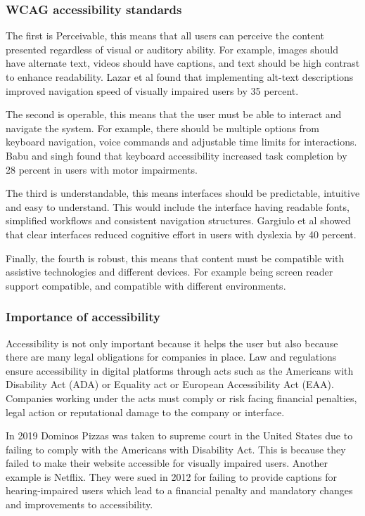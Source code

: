 \documentclass[]{project_final}
\begin{document}
\subsubsection{WCAG accessibility standards}

The first is Perceivable, this means that all users can perceive the content presented regardless of visual or auditory ability. For example, images should have alternate text, videos should have captions, and text should be high contrast to enhance readability. Lazar et al found that implementing alt-text descriptions improved navigation speed of visually impaired users by 35 percent.

The second is operable, this means that the user must be able to interact and navigate the system. For example, there should be multiple options from keyboard navigation, voice commands and adjustable time limits for interactions.  Babu and singh found that keyboard accessibility increased task completion by 28 percent in users with motor impairments.

The third is understandable, this means interfaces should be predictable, intuitive and easy to understand. This would include the interface having readable fonts, simplified workflows and consistent navigation structures. Gargiulo et al showed that clear interfaces reduced cognitive effort in users with dyslexia by 40 percent.

Finally, the fourth is robust, this means that content must be compatible with assistive technologies and different devices. For example being screen reader support compatible, and compatible with different environments.

\subsubsection{Importance of accessibility}

Accessibility is not only important because it helps the user but also because there are many legal obligations for companies in place. Law and regulations ensure accessibility in digital platforms through acts such as the Americans with Disability Act (ADA) or Equality act or European Accessibility Act (EAA). Companies working under the acts must comply or risk facing financial penalties, legal action or reputational damage to the company or interface.

In 2019 Dominos Pizzas was taken to supreme court in the United States due to failing to comply with the Americans with Disability Act. This is because they failed to make their website accessible for visually impaired users.
Another example is Netflix. They were sued in 2012 for failing to provide captions for hearing-impaired users which lead to a financial penalty and mandatory changes and
improvements to accessibility.
\end{document}
